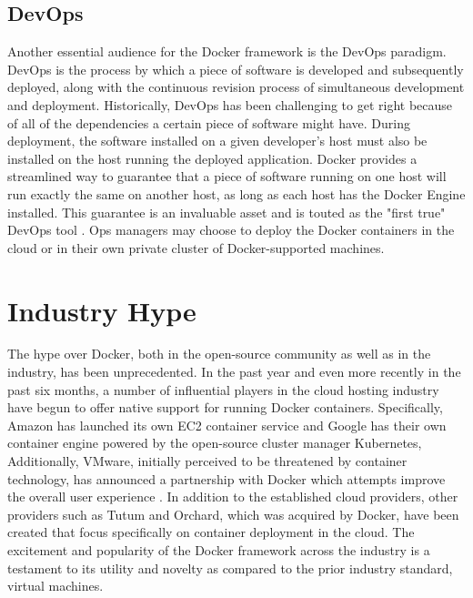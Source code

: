 \subsection{DevOps}
Another essential audience for the Docker framework is the DevOps paradigm. DevOps is the process by which a piece of software is developed and subsequently deployed, along with the continuous revision process of simultaneous development and deployment. Historically, DevOps has been challenging to get right because of all of the dependencies a certain piece of software might have. During deployment, the software installed on a given developer's host must also be installed on the host running the deployed application. Docker provides a streamlined way to guarantee that a piece of software running on one host will run exactly the same on another host, as long as each host has the Docker Engine installed. This guarantee is an invaluable asset and is touted as the "first true" DevOps tool \cite{devops}. Ops managers may choose to deploy the Docker containers in the cloud or in their own private cluster of Docker-supported machines.


\section{Industry Hype}\label{ch2:industry}

The hype over Docker, both in the open-source community as well as in the industry, has been unprecedented. In the past year and even more recently in the past six months, a number of influential players in the cloud hosting industry have begun to offer native support for running Docker containers. Specifically, Amazon has launched its own EC2 container service \cite{aws} and Google has their own container engine powered by the open-source cluster manager Kubernetes, Additionally, VMware, initially perceived to be threatened by container technology, has announced a partnership with Docker which attempts improve the overall user experience \cite{vmware}. In addition to the established cloud providers, other providers such as Tutum and Orchard, which was acquired by Docker, have been created that focus specifically on container deployment in the cloud. The excitement and popularity of the Docker framework across the industry is a testament to its utility and novelty as compared to the prior industry standard, virtual machines.


